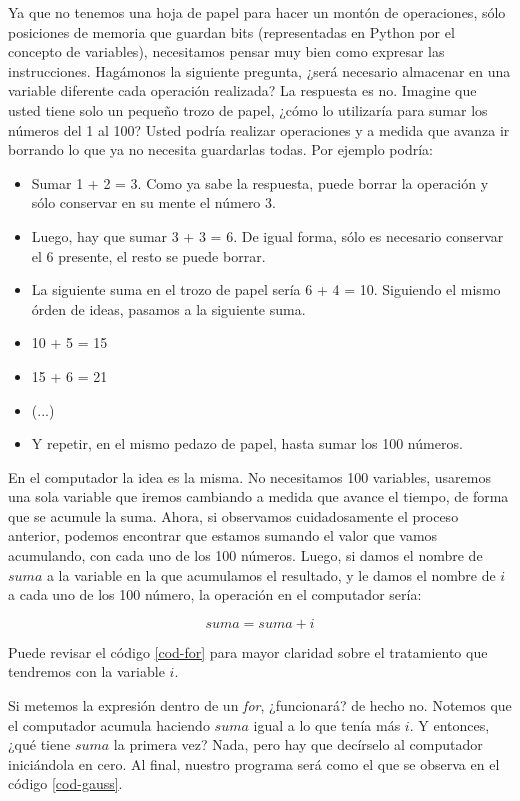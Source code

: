 Ya que no tenemos una hoja de papel para hacer un montón de operaciones, sólo posiciones de memoria que guardan bits (representadas en Python por el concepto de variables), necesitamos pensar muy bien como expresar las instrucciones. Hagámonos la siguiente pregunta, ¿será necesario almacenar en una variable diferente cada operación realizada? La respuesta es no. Imagine que usted tiene solo un pequeño trozo de papel, ¿cómo lo utilizaría para sumar los números del 1 al 100? Usted podría realizar operaciones y a medida que avanza ir borrando lo que ya no necesita guardarlas todas. Por ejemplo podría:

\begin{itemize}
\item Sumar 1 + 2 = 3. Como ya sabe la respuesta, puede borrar la operación y sólo conservar en su mente el número 3.
\item Luego, hay que sumar 3 + 3 = 6. De igual forma, sólo es necesario conservar el 6 presente, el resto se puede borrar.
\item La siguiente suma en el trozo de papel sería 6 + 4 = 10. Siguiendo el mismo órden de ideas, pasamos a la siguiente suma.
\item 10 + 5 = 15
\item 15 + 6 = 21
\item (...)
\item Y repetir, en el mismo pedazo de papel, hasta sumar los 100 números. 
\end{itemize}

En el computador la idea es la misma. No necesitamos 100 variables, usaremos una sola variable que iremos cambiando a medida que avance el tiempo, de forma que se acumule la suma. Ahora, si observamos cuidadosamente el proceso anterior, podemos encontrar que estamos sumando el valor que vamos acumulando, con cada uno de los 100 números. Luego, si damos el nombre de $suma$ a la variable en la que acumulamos el resultado, y le damos el nombre de $i$ a cada uno de los 100 número, la operación en el computador sería: 

\begin{equation}
suma = suma + i
\end{equation}

Puede revisar el código \ref{cod-for} para mayor claridad sobre el tratamiento que tendremos con la variable $i$.

Si metemos la expresión dentro de un \emph{for}, ¿funcionará? de hecho no. Notemos que el computador acumula haciendo $suma$ igual a lo que tenía más $i$. Y entonces, ¿qué tiene $suma$ la primera vez? Nada, pero hay que decírselo al computador iniciándola en cero. Al final, nuestro programa será como el que se observa en el código \ref{cod-gauss}. \\

